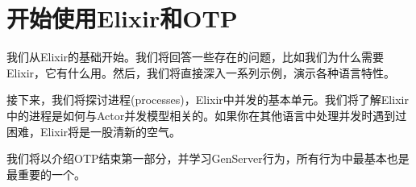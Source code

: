 \part{开始使用Elixir和OTP}\label{part1}

我们从Elixir的基础开始。我们将回答一些存在的问题，比如我们为什么需要Elixir，它有什么用。然后，我们将直接深入一系列示例，演示各种语言特性。

接下来，我们将探讨进程(processes)，Elixir中并发的基本单元。我们将了解Elixir中的进程是如何与Actor并发模型相关的。如果你在其他语言中处理并发时遇到过困难，Elixir将是一股清新的空气。

我们将以介绍OTP结束第一部分，并学习GenServer行为，所有行为中最基本也是最重要的一个。
